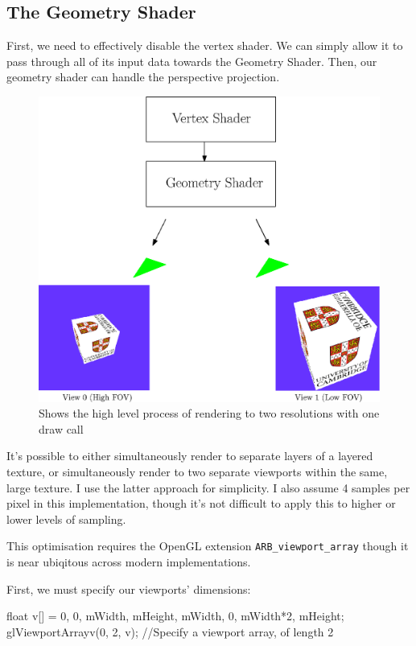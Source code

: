 \documentclass[12pt,a4paper,twoside,openright]{report}
\begin{document}
\subsection{The Geometry Shader}

First, we need to effectively disable the vertex shader. We can simply allow it to pass through all of its input data towards the Geometry Shader.
Then, our geometry shader can handle the perspective projection.

\begin{figure}[tbh]
\centerline{\includegraphics[scale=0.6]{figs/geoshader.eps}}
\caption{Shows the high level process of rendering to two resolutions with one draw call}
\label{epsfig1}
\end{figure}

It's possible to either simultaneously render to separate layers of a layered texture, or simultaneously render to two separate viewports within the same, large texture. I use the latter approach for simplicity. I also assume 4 samples per pixel in this implementation, though it's not difficult to apply this to higher or lower levels of sampling. 

This optimisation requires the OpenGL extension \texttt{ARB\_viewport\_array} though it is near ubiqitous across modern implementations.

First, we must specify our viewports' dimensions:

\begin{blockcode}
float v[] = {0, 0, mWidth, mHeight,
             mWidth, 0, mWidth*2, mHeight};
glViewportArrayv(0, 2, v); //Specify a viewport array, of length 2
\end{blockcode} 
\end{document}
